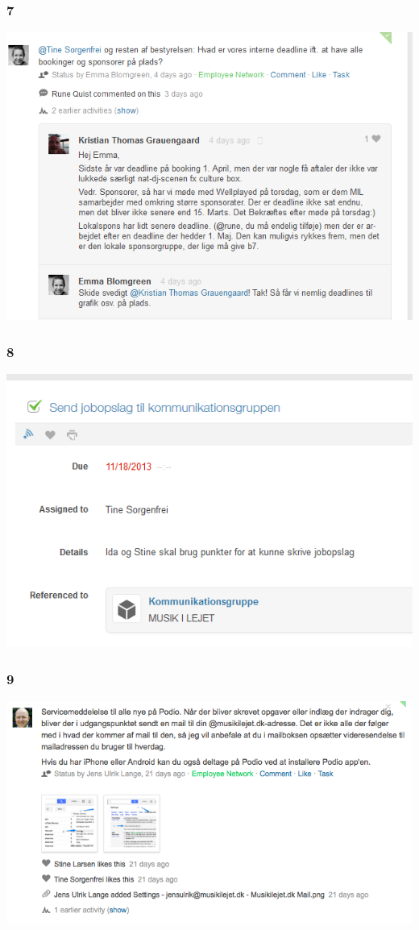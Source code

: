\subsubsection{7}
\label{podio_7}
\includegraphics[scale=0.7]{Pictures/Podio_7.png}

\subsubsection{8}
\label{podio_8}
\includegraphics[scale=0.7]{Pictures/Podio_8.png}

\subsubsection{9}
\label{podio_9}
\includegraphics[scale=0.7]{Pictures/Podio_9.png}

